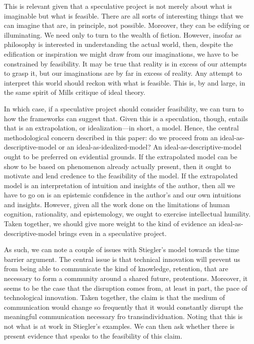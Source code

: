 \documentclass[letterpaper,notitlepage,12pt]{article}
\begin{document}
This is relevant given that a speculative project is not merely about what is
imaginable but what is feasible.
There are all sorts of interesting things that we can imagine that are, in
principle, not possible.
Moreover, they can be edifying or illuminating.
We need only to turn to the wealth of fiction.
However, insofar as philosophy is interested in understanding the actual world,
then, despite the edification or inspiration we might draw from our
imaginations, we have to be constrained by feasibility.
It may be true that reality is in excess of our attempts to grasp it, but our
imaginations are by far in excess of reality.
Any attempt to interpret this world should reckon with what is feasible.
This is, by and large, in the same spirit of Mills critique of ideal theory.

In which case, if a speculative project should consider feasibility, we can turn
to how the frameworks can suggest that.
Given this is a speculation, though, entails that is an extrapolation, or
idealization---in short, a model.
Hence, the central methodological concern described in this paper: do we proceed
from an ideal-as-descriptive-model or an ideal-as-idealized-model?
An ideal-as-descriptive-model ought to be preferred on evidential grounds.
If the extrapolated model can be show to be based on phenomenon already actually
present, then it ought to motivate and lend credence to the feasibility of the
model.
If the extrapolated model is an interpretation of intuition and insights of the
author, then all we have to go on is an epistemic confidence in the author's and
our own intuitions and insights.
However, given all the work done on the limitations of human cognition,
rationality, and epistemology, we ought to exercise intellectual humility.
Taken together, we should give more weight to the kind of evidence an
ideal-as-descriptive-model brings even in a speculative project.

As such, we can note a couple of issues with Stiegler's model towards the time
barrier argument.
The central issue is that technical innovation will prevent us from being able
to communicate the kind of knowledge, retention, that are necessary to form a
community around a shared future, protentions.
Moreover, it seems to be the case that the disruption comes from, at least in
part, the pace of technological innovation.
Taken together, the claim is that the medium of communication would change so
frequently that it would constantly disrupt the meaningful communication
necessary fro transindividuation.
Noting that this is not what is at work in Stiegler's examples.
We can then ask whether there is present evidence that speaks to the feasibility
of this claim.
\end{document}
